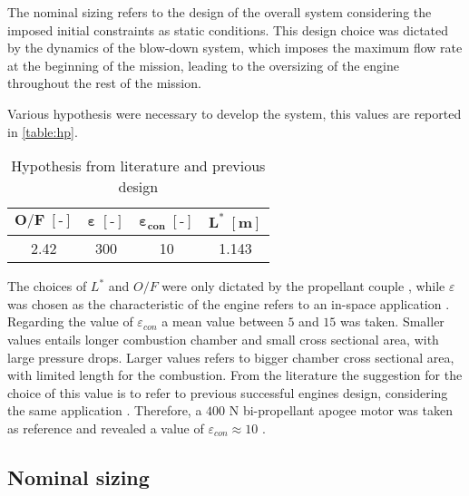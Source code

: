 The nominal sizing refers to the design of the overall system considering the imposed initial constraints as static conditions. This design choice was dictated by the dynamics of the blow-down system, which imposes the maximum flow rate at the beginning of the mission, leading to the oversizing of the engine throughout the rest of the mission. %

Various hypothesis were necessary to develop the system, this values are reported in \autoref{table:hp}.

\begin{table}[H]
    \renewcommand{\arraystretch}{1.2}
    \centering
    \begin{tabular}{|c|c|c|c|}
        \hline
        $\boldsymbol{O/F \; [\textbf{-}]}$ & $\boldsymbol{\varepsilon \; [\textbf{-}]}$ & $\boldsymbol{\varepsilon_{con} \; [\textbf{-}]}$ & $\boldsymbol{L^* \; [\textbf{m}]}$ \\
        \hline
        \hline
        2.42 & 300 & 10 & 1.143 \\
        \hline
    \end{tabular}
    \caption{Hypothesis from literature and previous design}
    \label{table:hp}
\end{table}

The choices of $L^*$  and $O/F$ were only dictated by the propellant couple \cite{sutton}, while $\varepsilon$ was chosen as the characteristic of the engine refers to an in-space application \cite{ariane_datasheet}. Regarding the value of $\varepsilon_{con}$ a mean value between $5$ and $15$ was taken. Smaller values entails longer combustion chamber and small cross sectional area, with large pressure drops. Larger values refers to bigger chamber cross sectional area, with limited length for the combustion. From the literature the suggestion for the choice of this value is to refer to previous successful engines design, considering the same application \cite{huzel_huang}. Therefore, a $400$ N bi-propellant apogee motor was taken as reference and revealed a value of $\varepsilon_{con} \approx 10$ \cite{ariane_datasheet}.

\subsection{Nominal sizing}
\label{subsec:nominal_sizing}

